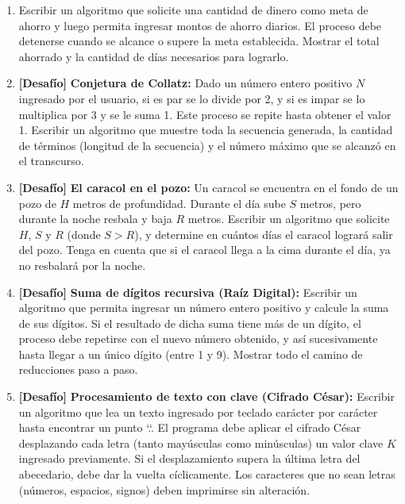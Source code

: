 \begin{ejercicioClase}
\begin{enumerate}
    \item Escribir un algoritmo que solicite una cantidad de dinero como meta de ahorro y luego permita ingresar montos de ahorro diarios. El proceso debe detenerse cuando se alcance o supere la meta establecida. Mostrar el total ahorrado y la cantidad de días necesarios para lograrlo.
    \item \textbf{[Desafío]} \textbf{Conjetura de Collatz:} Dado un número entero positivo $N$ ingresado por el usuario, si es par se lo divide por 2, y si es impar se lo multiplica por 3 y se le suma 1. Este proceso se repite hasta obtener el valor 1. Escribir un algoritmo que muestre toda la secuencia generada, la cantidad de términos (longitud de la secuencia) y el número máximo que se alcanzó en el transcurso.
    \item \textbf{[Desafío]} \textbf{El caracol en el pozo:} Un caracol se encuentra en el fondo de un pozo de $H$ metros de profundidad. Durante el día sube $S$ metros, pero durante la noche resbala y baja $R$ metros. Escribir un algoritmo que solicite $H$, $S$ y $R$ (donde $S > R$), y determine en cuántos días el caracol logrará salir del pozo. Tenga en cuenta que si el caracol llega a la cima durante el día, ya no resbalará por la noche.
    \item \textbf{[Desafío]} \textbf{Suma de dígitos recursiva (Raíz Digital):} Escribir un algoritmo que permita ingresar un número entero positivo y calcule la suma de sus dígitos. Si el resultado de dicha suma tiene más de un dígito, el proceso debe repetirse con el nuevo número obtenido, y así sucesivamente hasta llegar a un único dígito (entre 1 y 9). Mostrar todo el camino de reducciones paso a paso.
    \item \textbf{[Desafío]} \textbf{Procesamiento de texto con clave (Cifrado César):} Escribir un algoritmo que lea un texto ingresado por teclado carácter por carácter hasta encontrar un punto `.`. El programa debe aplicar el cifrado César desplazando cada letra (tanto mayúsculas como minúsculas) un valor clave $K$ ingresado previamente. Si el desplazamiento supera la última letra del abecedario, debe dar la vuelta cíclicamente. Los caracteres que no sean letras (números, espacios, signos) deben imprimirse sin alteración.
  \end{enumerate}
\end{ejercicioClase}

